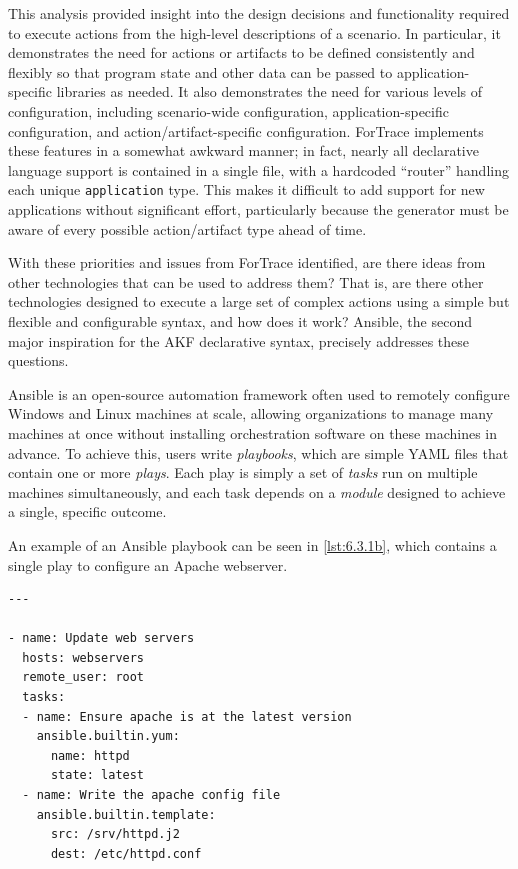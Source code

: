 \documentclass[letterpaper,12pt]{report}
\newcommand{\passthrough}[1]{#1}
\begin{document}
This analysis provided insight into the design decisions and
functionality required to execute actions from the high-level
descriptions of a scenario. In particular, it demonstrates the need for
actions or artifacts to be defined consistently and flexibly so that
program state and other data can be passed to application-specific
libraries as needed. It also demonstrates the need for various levels of
configuration, including scenario-wide configuration,
application-specific configuration, and action/artifact-specific
configuration. ForTrace implements these features in a somewhat awkward
manner; in fact, nearly all declarative language support is contained in
a single file, with a hardcoded ``router'' handling each unique
\passthrough{\lstinline!application!} type. This makes it difficult to
add support for new applications without significant effort,
particularly because the generator must be aware of every possible
action/artifact type ahead of time.

With these priorities and issues from ForTrace identified, are there
ideas from other technologies that can be used to address them? That is,
are there other technologies designed to execute a large set of complex
actions using a simple but flexible and configurable syntax, and how
does it work? Ansible, the second major inspiration for the AKF
declarative syntax, precisely addresses these questions.

Ansible \cite{AnsibleAnsible2025} is an open-source automation
framework often used to remotely configure Windows and Linux machines at
scale, allowing organizations to manage many machines at once without
installing orchestration software on these machines in advance. To
achieve this, users write \emph{playbooks}, which are simple YAML files
that contain one or more \emph{plays}. Each play is simply a set of
\emph{tasks} run on multiple machines simultaneously, and each task
depends on a \emph{module} designed to achieve a single, specific
outcome.

An example of an Ansible playbook can be seen in \autoref{lst:6.3.1b},
which contains a single play to configure an Apache webserver.

\begin{lstlisting}[label={lst:6.3.1b}, caption={Minimal Ansible playbook for updating an Apache server \cite{ansibleprojectcontributorsAnsiblePlaybooks}}, ]
---

- name: Update web servers
  hosts: webservers
  remote_user: root
  tasks:
  - name: Ensure apache is at the latest version
    ansible.builtin.yum:
      name: httpd
      state: latest
  - name: Write the apache config file
    ansible.builtin.template:
      src: /srv/httpd.j2
      dest: /etc/httpd.conf
\end{lstlisting}
\end{document}
